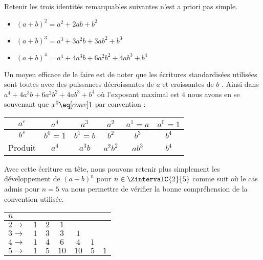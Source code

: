 Retenir les trois identités remarquables suivantes n'est a priori pas simple.

\begin{itemize}[label = \small\textbullet]
	\item $(a + b)^2 = a^2 + 2 a b + b^2$

	\item $(a + b)^3 = a^3 + 3 a^2 b + 3 a b^2 + b^3$

	\item $(a + b)^4 = a^4 + 4 a^3 b + 6 a^2 b^2 + 4 a b^3 + b^4$
\end{itemize}

Un moyen efficace de le faire est de noter que les écritures standardisées utilisées sont toutes avec des puissances décroissantes de $a$ et croissantes de $b$ .
Ainsi dans $a^4 + 4 a^3 b + 6 a^2 b^2 + 4 a b^3 + b^4$ où l'exposant maximal est $4$ nous avons en se souvenant que $x^0 \eq[conv] 1$ par convention :

\medskip
\begin{center}
\begin{tabular}{c*{5}{|c}}
	$a^r$
		& $a^4$      &  $a^3$      &  $a^2$      &  $a^1 = a$  &  $a^0 = 1$
	\\ \hline
	$b^s$ 
		& $b^0 = 1$  &  $b^1 = b$  &  $b^2$      &  $b^3$      &  $b^4$
	\\ \hline
	Produit 
		& $a^4$      &  $a^3 b$    &  $a^2 b^2$  &  $a b^3$    &  $b^4$
\end{tabular}
\end{center}

\medskip
Avec cette écriture en tête, nous pouvons retenir plus simplement les développement de $(a + b)^n$ pour $n \in \ZintervalC{2}{5}$ comme suit où le cas admis pour $n = 5$ va nous permettre de vérifier la bonne compréhension de la convention utilisée.

\medskip
\begin{center}
\begin{tabular}{|l*{6}{|c}|}
	\hline
	$n$
		&      &       &        &        &       &
	\\ \hline
	$2 \rightarrow$ 
		& $1$  &  $2$  &  $1$   &        &       &
	\\ \hline
	$3 \rightarrow$ 
		& $1$  &  $3$  &  $3$   &  $1$   &       &
	\\ \hline
	$4 \rightarrow$ 
		& $1$  &  $4$  &  $6$   &  $4$   &  $1$  &
	\\ \hline
	$5 \rightarrow$ 
		& $1$  &  $5$  &  $10$  &  $10$  &  $5$  &  $1$
	\\ \hline
\end{tabular}
\end{center}

